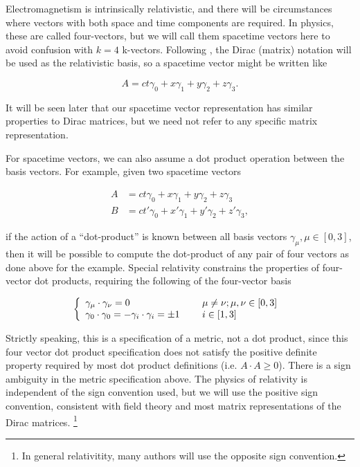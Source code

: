 Electromagnetism is intrinsically relativistic, and there will be circumstances where vectors with both space and time components are required.
In physics, these are called four-vectors, but we will call them spacetime vectors here to avoid confusion with \( k = 4 \) k-vectors.
Following \citep{doran2003gap}, the Dirac (matrix) notation will be used as the relativistic basis, so a spacetime vector might be written like

\begin{dmath}\label{eqn:prerequisites:300}
A = c t \gamma_0 + x \gamma_1 + y \gamma_2 + z \gamma_3.
\end{dmath}

It will be seen later that our spacetime vector representation has similar properties to Dirac matrices, but we need not refer to any specific matrix representation.

For spacetime vectors, we can also assume a dot product operation between the basis vectors.  For example, given two spacetime vectors

\begin{dmath}\label{eqn:prerequisites:380}
\begin{aligned}
A &= c t \gamma_0 + x \gamma_1 + y \gamma_2 + z \gamma_3 \\
B &= c t' \gamma_0 + x' \gamma_1 + y' \gamma_2 + z' \gamma_3,
\end{aligned}
\end{dmath}

if the action of a ``dot-product'' is known between all basis vectors \( \gamma_\mu, \mu \in [0,3] \), then it will be possible to compute the dot-product of any pair of four vectors as done above for the  example.  Special relativity constrains the properties of four-vector dot products, requiring the following of the four-vector basis

\begin{dmath}\label{eqn:prerequisites:400}
\left\{
\begin{array}{l l}
\gamma_\mu \cdot \gamma_\nu = 0 & \quad \mbox{ \( \mu \ne \nu ; \mu, \nu \in [0,3] \) } \\
\gamma_0 \cdot \gamma_0 = -\gamma_i \cdot \gamma_i = \pm 1 & \quad \mbox{ \( i \in [1,3] \) }
\end{array}
\right.
\end{dmath}

Strictly speaking, this is a specification of a metric, not a dot product, since this four vector dot product specification does not satisfy the positive definite property required by most dot product definitions (i.e. \( A \cdot A \ge 0 \)).
There is a sign ambiguity in the metric specification above.  The physics of relativity is independent of the sign convention used, but we will use the positive sign convention, consistent with field theory and most matrix representations of the Dirac matrices.
\footnote{In general relativitity, many authors will use the opposite sign convention.}

